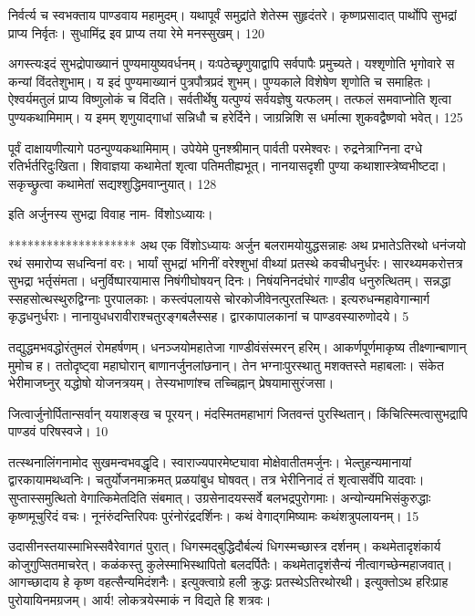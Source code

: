 निर्वर्त्य च स्वभक्ताय पाण्डवाय महामुदम्।
यथापूर्वं समुद्रांते शेतेस्म सुहृदंतरे।
कृष्णप्रसादात् पार्थोपि सुभद्रां प्राप्य निर्वृतः।
सुधामिंद्र इव प्राप्य तया रेमे मनस्सुखम्।
120

अगस्त्यःइदं सुभद्रोपाख्यानं पुण्यमायुष्यवर्धनम्।
यःपठेच्छृणुयाद्वापि सर्वपापैः प्रमुच्यते।
यश्शृणोति भृगोवारे स कन्यां विंदतेशुभाम्।
य इदं पुण्यमाख्यानं पुत्रपौत्रप्रदं शुभम्।
पुण्यकाले विशेषेण शृणोति च समाहितः।
ऐश्वर्यमतुलं प्राप्य विष्णुलोकं च विंदति।
सर्वतीर्थेषु यत्पुण्यं सर्वयज्ञेषु यत्फलम्।
तत्फलं समवाप्नोति शृत्वा पुण्यकथामिमाम्।
य इमम् शृणुयाद्गाधां सन्निधौ च हरेर्दिने।
जाग्रन्निशि स धर्मात्मा शुकवद्वैष्णवो भवेत्।
125

पूर्वं दाक्षायणीत्यागे पठन्पुण्यकथामिमाम्।
उपेयेमे पुनश्श्रीमान् पार्वती परमेश्वरः।
रुद्रनेत्राग्निना दग्धे रतिर्भर्तरिदुःखिता।
शिवाज्ञया कथामेतां शृत्वा पतिमतीह्यभूत्।
नानयासदृशी पुण्या कथाशास्त्रेष्वभीष्टदा।
सकृच्छ्रुत्वा कथामेतां सद्यश्शुद्धिमवाप्नुयात्।
128

इति अर्जुनस्य सुभद्रा विवाह नाम- विंशोऽध्यायः।

********************
अथ एक विंशोऽध्यायः
अर्जुन बलरामयोयुद्धसन्नाहः अथ प्रभातेऽतिरथो धनंजयो रथं
समारोप्य सधन्विनां वरः।
भार्यां सुभद्रां भगिनीं वरेश्शुभां वीथ्यां
प्रतस्थे कवचीधनुर्धरः।
सारथ्यमकरोत्तत्र सुभद्रा भर्तृसंमता।
धनुर्विष्पारयामास निषंगीघोषयन् दिनः।
निषंयनिनदंघोरं गाण्डीव धनुरुत्थितम्।
सन्नद्धा स्सहसोत्थस्थुरुद्विग्नाः पुरपालकाः।
कस्त्वंपलायसे चोरकोजीवेनत्पुरतस्थितः।
इत्यरुधन्महावेगान्मार्ग कृद्धधनुर्धराः।
नानायुधधरावीराश्चतुरङ्गबलैस्सह।
द्वारकापालकानां च पाण्डवस्यारुणोदये।
5

तद्युद्धमभवद्धोरंतुमलं रोमहर्षणम्।
धनञ्जयोमहातेजा गाण्डीवंसंस्मरन् हरिम्।
आकर्णपूर्णमाकृष्य तीक्ष्णान्बाणान् मुमोच ह।
ततोदृष्ट्वा महाघोरान् बाणानर्जुनलांछनान्।
तेन भग्नाःपुरस्थातु मशक्तस्ते महाबलाः।
संकेत भेरीमाजघ्नुर् यद्धोषो योजनत्रयम्।
तेस्यभाणांश्च तच्चिह्नान् प्रेषयामासुरंजसा।

जित्वार्जुनोर्पितान्सर्वान् ययाशङ्ख च पूरयन्।
मंदस्मितमहाभागं जितवन्तं पुरस्थितान्।
किंचित्स्मित्वासुभद्रापि पाण्डवं परिषस्वजे।
10

तत्स्थनालिंगनामोद सुखमन्वभवद्धृदि।
स्वाराज्यपारमेष्ट्यावा मोक्षेवातीतमर्जुनः।
भेल्तुहन्यमानायां द्वारकायामथध्वनिः।
चतुर्योजनमाक्रमत् प्रळयांबुध घोषवत्।
तत्र भेरीनिनादं तं शृत्वासर्वेपि यादवाः।
सुप्तास्समुत्थितो वेगात्किमेतदिति संबमात्।
उग्रसेनादयस्सर्वे बलभद्रपुरोगमाः।
अन्योन्यमभिसंकुरुद्धाः कृष्णमूचुरिदं वचः।
नूनंरुंदन्तिरिपवः पुरंनोरंद्रदर्शिनः।
कथं वेगाद्गमिष्यामः कथंशत्रुपलायनम्।
15

उदासीनस्तयास्माभिस्सवैरेवागतं पुरात्।
धिगस्मद्बुद्धिदौर्बल्यं धिगस्मच्छास्त्र दर्शनम्।
कथमेतादृशंकार्य कोजुगुप्सितमाचरेत्।
कळंकस्तु कुलेस्माभिस्थापितो बलदर्पितैः।
कथमेतादृशंसैन्यं नीत्वागच्छेन्महाजवात्।
आगच्छादाय हे कृष्ण वहत्सैन्यमिदंशनैः।
इत्युक्त्वाग्रे हली क्रुद्धः प्रतस्थेऽतिरथोरथी।
इत्युक्तोऽथ हरिःप्राह पुरोयायिनमग्रजम्।
आर्य! लोकत्रयेस्माकं न विद्यते हि शत्रवः।

